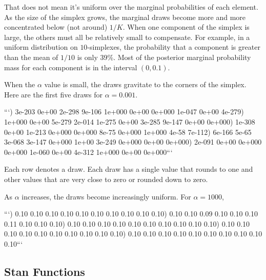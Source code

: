 \begin{description}
{\begin{description}
That does not mean it's uniform over the marginal probabilities of each element.  As the size of the simplex grows, the marginal draws become more and more concentrated below (not around) $1/K$.  When one component of the simplex is large, the others must all be relatively small to compensate.  For example, in a uniform distribution on $10$-simplexes, the probability that a component is greater than the mean of $1/10$ is only 39\%.  Most of the posterior marginal probability mass for each component is in the interval $(0, 0.1)$.


When the $\alpha$ value is small, the draws gravitate to the corners of the simplex.  Here are the first five draws for $\alpha = 0.001$.


```) 3e-203 0e+00 2e-298 9e-106 1e+000 0e+00 0e+000 1e-047 0e+00 4e-279) 1e+000 0e+00 5e-279 2e-014 1e-275 0e+00 3e-285 9e-147 0e+00 0e+000) 1e-308 0e+00 1e-213 0e+000 0e+000 8e-75 0e+000 1e+000 4e-58 7e-112) 6e-166 5e-65 3e-068 3e-147 0e+000 1e+00 3e-249 0e+000 0e+00 0e+000) 2e-091 0e+00 0e+000 0e+000 1e-060 0e+00 4e-312 1e+000 0e+00 0e+000\n ```


Each row denotes a draw.  Each draw has a single value that rounds to one and other values that are very close to zero or rounded down to zero.


As $\alpha$ increases, the draws become increasingly uniform.  For $\alpha = 1000$,


```) 0.10 0.10 0.10 0.10 0.10 0.10 0.10 0.10 0.10 0.10) 0.10 0.10 0.09 0.10 0.10 0.10 0.11 0.10 0.10 0.10) 0.10 0.10 0.10 0.10 0.10 0.10 0.10 0.10 0.10 0.10) 0.10 0.10 0.10 0.10 0.10 0.10 0.10 0.10 0.10 0.10) 0.10 0.10 0.10 0.10 0.10 0.10 0.10 0.10 0.10 0.10\n ```




\subsection{Stan Functions}


\begin{description}    \end{description}


\begin{description}  \end{description}



\end{description}}
\end{description}

